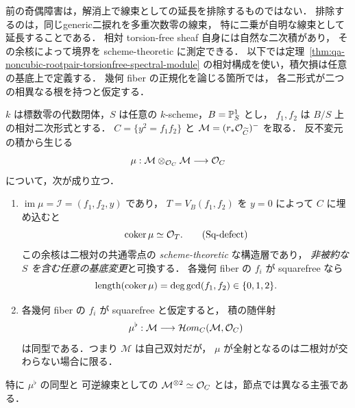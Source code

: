 前の奇偶障害は，解消上で線束としての延長を排除するものではない．
排除するのは，同じgeneric二捩れを多重次数零の線束，
特に二乗が自明な線束として延長することである．
相対 torsion-free sheaf 自身には自然な二次積があり，
その余核によって境界を scheme-theoretic に測定できる．
以下では定理~\ref{thm:qa-noncubic-rootpair-torsionfree-spectral-module}
の相対構成を使い，積欠損は任意の基底上で定義する．
幾何 fiber の正規化を論じる箇所では，
各二形式が二つの相異なる根を持つと仮定する．

\begin{proposition}[乗法欠損の長さと自己双対性]
\label{prop:qa-spectral-product-defect}
$k$ は標数零の代数閉体，$S$ は任意の
$k$-scheme，$B=\mathbb P^1_S$ とし，
$f_1,f_2$ は $B/S$ 上の相対二次形式とする．
$C=\{y^2=f_1f_2\}$ と
$\mathcal M=(r_*\mathcal O_{\widetilde C})^-$ を取る．
反不変元の積から生じる
\[
 \mu:\mathcal M\otimes_{\mathcal O_C}\mathcal M\longrightarrow\mathcal O_C
\]
について，次が成り立つ．
\begin{enumerate}
\item $\operatorname{im}\mu=\mathcal I=(f_1,f_2,y)$ であり，
  $T=V_B(f_1,f_2)$ を $y=0$ によって $C$ に埋め込むと
  \[
     \operatorname{coker}\mu\simeq\mathcal O_T .
     \tag{Sq-defect}\label{eq:qa-spectral-square-defect}
  \]
  この余核は二根対の共通零点の
  \emph{scheme-theoretic} な構造層であり，
  \emph{非被約な $S$ を含む任意の基底変更}と可換する．
  各幾何 fiber の $f_i$ が squarefree なら
  \[
     \operatorname{length}(\operatorname{coker}\mu)
       =\deg\gcd(f_1,f_2)\in\{0,1,2\}.
  \]
\item 各幾何 fiber の $f_i$ が squarefree と仮定すると，
  積の随伴射
  \[
   \mu^\flat:\mathcal M
       \longrightarrow
       \mathcal H om_C(\mathcal M,\mathcal O_C)
  \]
  は同型である．つまり $\mathcal M$ は自己双対だが，
  $\mu$ が全射となるのは二根対が交わらない場合に限る．
\end{enumerate}
特に $\mu^\flat$ の同型と
可逆線束としての $\mathcal M^{\otimes2}\simeq\mathcal O_C$
とは，節点では異なる主張である．
\end{proposition}
